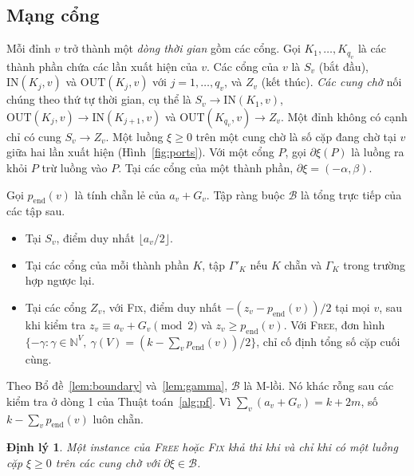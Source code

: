 \documentclass[pdflatex,sn-mathphys-num]{sn-jnl}
\theoremstyle{thmstyleone}%
\newtheorem{theorem}{Định lý}%
\theoremstyle{thmstyletwo}%
\theoremstyle{thmstylethree}%
\newcommand{\N}{\mathbb{N}}
\newcommand{\cB}{\mathcal{B}}
\newcommand{\IN}{\mathrm{IN}}
\newcommand{\OUT}{\mathrm{OUT}}
\newcommand{\FIX}{\textup{\textsc{Fix}}}
\newcommand{\FREE}{\textup{\textsc{Free}}}
\newcommand{\floor}[1]{\lfloor #1\rfloor}
\begin{document}
\subsection{Mạng cổng}

Mỗi đỉnh $v$ trở thành một \emph{dòng thời gian} gồm các cổng. Gọi $K_1,\dots,K_{q_v}$ là các thành phần chứa các lần xuất hiện của $v$. Các cổng của $v$ là $S_v$ (bắt đầu), $\IN(K_j,v)$ và $\OUT(K_j,v)$ với $j=1,\dots,q_v$, và $Z_v$ (kết thúc). \emph{Các cung chờ} nối chúng theo thứ tự thời gian, cụ thể là $S_v\to\IN(K_1,v)$, $\OUT(K_j,v)\to\IN(K_{j+1},v)$ và $\OUT(K_{q_v},v)\to Z_v$. Một đỉnh không có cạnh chỉ có cung $S_v\to Z_v$. Một luồng $\xi\ge0$ trên một cung chờ là số cặp đang chờ tại $v$ giữa hai lần xuất hiện (Hình~\ref{fig:ports}). Với một cổng $P$, gọi $\partial\xi(P)$ là luồng ra khỏi $P$ trừ luồng vào $P$. Tại các cổng của một thành phần, $\partial\xi=(-\alpha,\beta)$.

Gọi $p_{\mathrm{end}}(v)$ là tính chẵn lẻ của $a_v+G_v$. Tập ràng buộc $\cB$ là tổng trực tiếp của các tập sau.
\begin{itemize}
\item Tại $S_v$, điểm duy nhất $\floor{a_v/2}$.
\item Tại các cổng của mỗi thành phần $K$, tập $\Gamma'_K$ nếu $K$ chẵn và $\Gamma_K$ trong trường hợp ngược lại.
\item Tại các cổng $Z_v$, với \FIX{}, điểm duy nhất $-(z_v-p_{\mathrm{end}}(v))/2$ tại mọi $v$, sau khi kiểm tra $z_v\equiv a_v+G_v \pmod 2$ và $z_v\ge p_{\mathrm{end}}(v)$. Với \FREE{}, đơn hình $\{-\gamma:\gamma\in\N^V,\ \gamma(V)=(k-\sum_vp_{\mathrm{end}}(v))/2\}$, chỉ cố định tổng số cặp cuối cùng.
\end{itemize}
Theo Bổ đề~\ref{lem:boundary} và~\ref{lem:gamma}, $\cB$ là M-lồi. Nó khác rỗng sau các kiểm tra ở dòng 1 của Thuật toán~\ref{alg:pf}. Vì $\sum_v(a_v+G_v)=k+2m$, số $k-\sum_vp_{\mathrm{end}}(v)$ luôn chẵn.

\begin{theorem}\label{thm:reduction}
Một instance của \FREE{} hoặc \FIX{} khả thi khi và chỉ khi có một luồng cặp $\xi\ge0$ trên các cung chờ với $\partial\xi\in\cB$.
\end{theorem}
\end{document}
